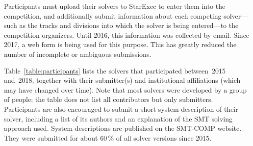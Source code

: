 \documentclass[twoside,11pt]{article}
\begin{document}
Participants must upload their solvers to StarExec to enter them into
the competition, and additionally submit information about each
competing solver---such as the tracks and divisions into which the
solver is being entered---to the competition organizers.  Until 2016,
this information was collected by email.  Since 2017, a web form is
being used for this purpose.  This has greatly reduced the number of
incomplete or ambiguous submissions.

Table~\ref{table:participants} lists the solvers that participated
between~2015 and~2018, together with their submitter(s) and
institutional affiliations (which may have changed over time).  Note
that most solvers were developed by a group of people; the table does
not list all contributors but only submitters.
%
Participants are also encouraged to submit a short system description
of their solver, including a list of its authors and an explanation of
the SMT solving approach used.  System descriptions are published on
the SMT-COMP website.  They were submitted for about 60\,\% of all
solver versions since 2015.
\end{document}
